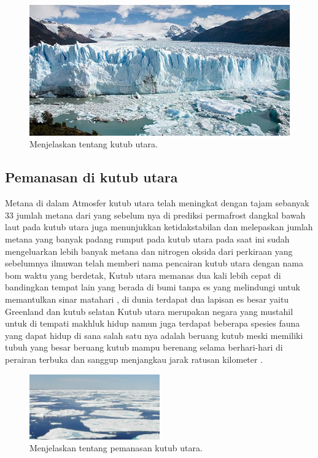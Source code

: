 \begin{figure}[ht]
\centerline{\includegraphics[width=1\textwidth]{figures/arctic.jpg}}
\caption{Menjelaskan tentang kutub utara.}	
\label{Kutub_Utara}
\end{figure}
	
\subsection{Pemanasan di kutub utara}
		Metana di dalam Atmosfer kutub utara telah meningkat dengan tajam sebanyak 33%
	jumlah metana dari yang sebelum nya di prediksi permafrost dangkal bawah laut pada kutub utara juga menunjukkan ketidakstabilan dan melepaskan jumlah metana
	yang banyak padang rumput pada kutub utara pada saat ini sudah mengeluarkan lebih banyak metana dan nitrogen oksida dari perkiraan yang sebelumnya ilmuwan 
	telah memberi nama pencairan kutub utara dengan nama bom waktu yang berdetak, Kutub utara memanas dua kali lebih cepat di bandingkan tempat lain yang berada
	di bumi tanpa es yang melindungi untuk memantulkan sinar matahari , di dunia terdapat dua lapisan es besar yaitu Greenland dan kutub selatan Kutub utara merupakan
	negara yang mustahil untuk di tempati makhluk hidup namun juga terdapat beberapa spesies fauna yang dapat hidup di sana salah satu nya adalah beruang kutub
	meski memiliki tubuh yang besar beruang kutub mampu berenang selama berhari-hari di perairan terbuka dan sanggup menjangkau jarak ratusan kilometer .

\begin{figure}[ht]
\centerline{\includegraphics[width=0.5\textwidth]{figures/arctic1.pdf}}
\caption{Menjelaskan tentang pemanasan kutub utara.}	
\label{Pemanasan_Kutub_Utara}
\end{figure}

